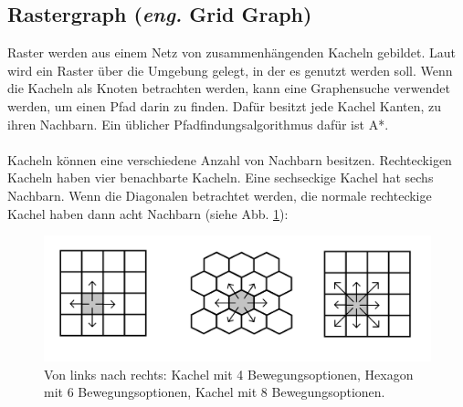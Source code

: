 \subsection{Rastergraph (\textit{eng.} Grid Graph)}
Raster werden aus einem Netz von zusammenhängenden Kacheln gebildet.
Laut \cite{Grid:02} wird ein Raster über die Umgebung gelegt, in der es genutzt werden soll.
Wenn die Kacheln als Knoten betrachten werden, kann eine Graphensuche verwendet werden, um einen Pfad darin zu finden.
Dafür besitzt jede Kachel Kanten, zu ihren Nachbarn. 
Ein üblicher Pfadfindungsalgorithmus dafür ist A*.
\\\\
Kacheln können eine verschiedene Anzahl von Nachbarn besitzen.
Rechteckigen Kacheln haben vier benachbarte Kacheln.
Eine sechseckige Kachel hat sechs Nachbarn. Wenn die Diagonalen betrachtet werden, die normale rechteckige Kachel haben dann acht Nachbarn (siehe Abb. \ref{sec2a}):
\begin{figure} %
	\centering
	\includegraphics[width=\textwidth]{images/Grid_Tiles.png}
	\caption{Von links nach rechts: Kachel mit 4 Bewegungsoptionen, Hexagon mit 6 Bewegungsoptionen, Kachel mit 8 Bewegungsoptionen.}
	\label{sec2a}
\end{figure}



